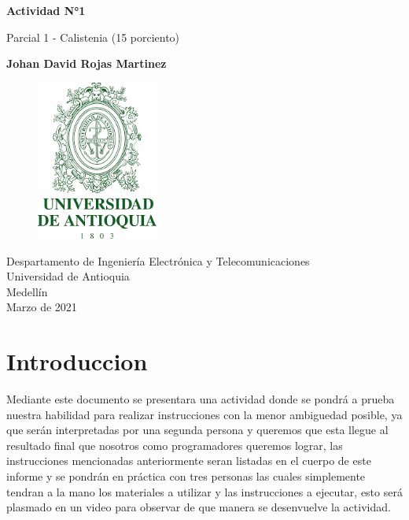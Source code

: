 \documentclass{article}
\begin{document}
\begin{titlepage}
    \begin{center}
        \vspace*{1cm}
            
        \Huge
        \textbf{Actividad N°1}
            
        \vspace{0.5cm}
        \LARGE
        Parcial 1 - Calistenia (15 porciento)
            
        \vspace{1.5cm}
            
        \textbf{Johan David Rojas Martinez}
            
        \vfill
            
        \vspace{0.8cm}
       
        \Large
\begin{figure}[h]
\includegraphics[width=4cm]{logoudea.png}
\centering
\end{figure}

        \vfill
        Despartamento de Ingeniería Electrónica y Telecomunicaciones\\
        Universidad de Antioquia\\
        Medellín\\
        Marzo de 2021
                 
    \end{center}
\end{titlepage}

\tableofcontents

\section{Introduccion}
\noindent
Mediante este documento se presentara una actividad donde se pondrá a prueba nuestra habilidad para realizar instrucciones con la menor ambiguedad posible, ya que serán interpretadas por una segunda persona y queremos que esta llegue al resultado final que nosotros como programadores queremos lograr, las instrucciones mencionadas anteriormente seran listadas en el cuerpo de este informe y se pondrán en práctica con tres personas las cuales simplemente tendran a la mano los materiales a utilizar y las instrucciones a ejecutar, esto será plasmado en un video para observar de que manera se desenvuelve la actividad. 
\end{document}
